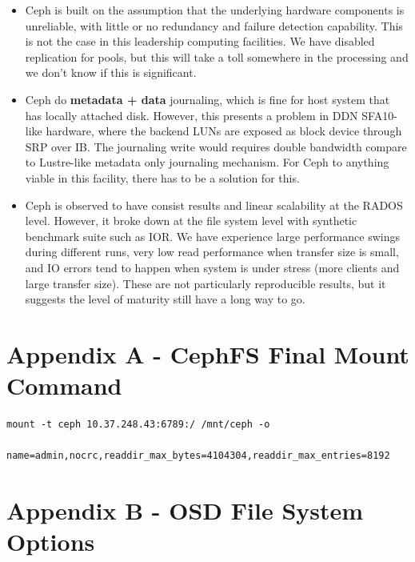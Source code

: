 \documentclass{article}
\begin{document}
\begin{itemize}

  \item Ceph is built on the assumption that the underlying hardware components
  is unreliable, with little or no redundancy and failure detection capability.
  This is not the case in this leadership computing facilities. We have disabled
  replication for pools, but this will take a toll somewhere in the processing
  and we don't know if this is significant.

  \item Ceph do \textbf{metadata + data} journaling, which is fine for host
  system that has locally attached disk. However, this presents a problem in DDN
  SFA10-like hardware, where the backend LUNs are exposed as block device
  through SRP over IB. The journaling write would requires double bandwidth
  compare to Lustre-like metadata only journaling mechanism. For Ceph to anything
  viable in this facility, there has to be a solution for this.

  \item Ceph is observed to have consist results and linear scalability at the
  RADOS level. However, it broke down at the file system level with synthetic
  benchmark suite such as IOR. We have experience large performance swings
  during different runs, very low read performance when transfer size is small,
  and IO errors tend to happen when system is under stress (more clients and
  large transfer size). These are not particularly reproducible results, but it
  suggests the level of maturity still have a long way to go.
  
\end{itemize}

\section*{Appendix A - CephFS Final Mount Command}

\begin{Verbatim}
mount -t ceph 10.37.248.43:6789:/ /mnt/ceph -o
      name=admin,nocrc,readdir_max_bytes=4104304,readdir_max_entries=8192
\end{Verbatim}


\section*{Appendix B - OSD File System Options}
\end{document}
